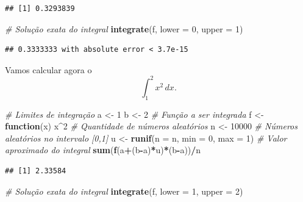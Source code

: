 \documentclass[
]{book}
\newenvironment{Shaded}{\begin{snugshade}}{\end{snugshade}}
\newcommand{\AttributeTok}[1]{\textcolor[rgb]{0.13,0.29,0.53}{#1}}
\newcommand{\CommentTok}[1]{\textcolor[rgb]{0.56,0.35,0.01}{\textit{#1}}}
\newcommand{\ControlFlowTok}[1]{\textcolor[rgb]{0.13,0.29,0.53}{\textbf{#1}}}
\newcommand{\DecValTok}[1]{\textcolor[rgb]{0.00,0.00,0.81}{#1}}
\newcommand{\FunctionTok}[1]{\textcolor[rgb]{0.13,0.29,0.53}{\textbf{#1}}}
\newcommand{\NormalTok}[1]{#1}
\newcommand{\OtherTok}[1]{\textcolor[rgb]{0.56,0.35,0.01}{#1}}
\newcommand{\SpecialCharTok}[1]{\textcolor[rgb]{0.81,0.36,0.00}{\textbf{#1}}}
\begin{document}
\begin{verbatim}
## [1] 0.3293839
\end{verbatim}

\begin{Shaded}
\begin{Highlighting}[]
\CommentTok{\# Solução exata do integral}
\FunctionTok{integrate}\NormalTok{(f, }\AttributeTok{lower =} \DecValTok{0}\NormalTok{, }\AttributeTok{upper =} \DecValTok{1}\NormalTok{)}
\end{Highlighting}
\end{Shaded}

\begin{verbatim}
## 0.3333333 with absolute error < 3.7e-15
\end{verbatim}

Vamos calcular agora o \[\int_{1}^{2} x^2\, dx.\]

\begin{Shaded}
\begin{Highlighting}[]
\CommentTok{\# Limites de integração}
\NormalTok{a }\OtherTok{\textless{}{-}} \DecValTok{1}
\NormalTok{b }\OtherTok{\textless{}{-}} \DecValTok{2}
\CommentTok{\# Função a ser integrada}
\NormalTok{f }\OtherTok{\textless{}{-}} \ControlFlowTok{function}\NormalTok{(x) x}\SpecialCharTok{\^{}}\DecValTok{2}
\CommentTok{\# Quantidade de números aleatórios}
\NormalTok{n }\OtherTok{\textless{}{-}} \DecValTok{10000}
\CommentTok{\# Números aleatórios no intervalo [0,1]}
\NormalTok{u }\OtherTok{\textless{}{-}} \FunctionTok{runif}\NormalTok{(}\AttributeTok{n =}\NormalTok{ n, }\AttributeTok{min =} \DecValTok{0}\NormalTok{, }\AttributeTok{max =} \DecValTok{1}\NormalTok{)}
\CommentTok{\# Valor aproximado do integral}
\FunctionTok{sum}\NormalTok{(}\FunctionTok{f}\NormalTok{(a}\SpecialCharTok{+}\NormalTok{(b}\SpecialCharTok{{-}}\NormalTok{a)}\SpecialCharTok{*}\NormalTok{u)}\SpecialCharTok{*}\NormalTok{(b}\SpecialCharTok{{-}}\NormalTok{a))}\SpecialCharTok{/}\NormalTok{n}
\end{Highlighting}
\end{Shaded}

\begin{verbatim}
## [1] 2.33584
\end{verbatim}

\begin{Shaded}
\begin{Highlighting}[]
\CommentTok{\# Solução exata do integral}
\FunctionTok{integrate}\NormalTok{(f, }\AttributeTok{lower =} \DecValTok{1}\NormalTok{, }\AttributeTok{upper =} \DecValTok{2}\NormalTok{)}
\end{Highlighting}
\end{Shaded}
\end{document}
